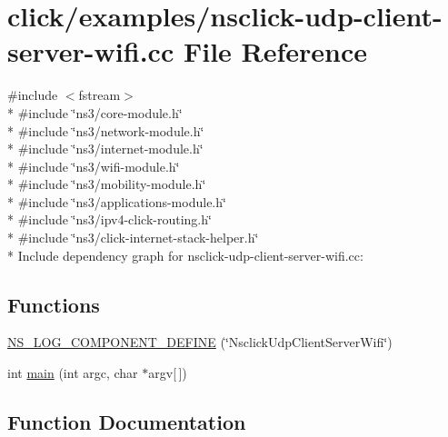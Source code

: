 \hypertarget{nsclick-udp-client-server-wifi_8cc}{}\section{click/examples/nsclick-\/udp-\/client-\/server-\/wifi.cc File Reference}
\label{nsclick-udp-client-server-wifi_8cc}
{\ttfamily \#include $<$fstream$>$}\\*
{\ttfamily \#include \char`\"{}ns3/core-\/module.\+h\char`\"{}}\\*
{\ttfamily \#include \char`\"{}ns3/network-\/module.\+h\char`\"{}}\\*
{\ttfamily \#include \char`\"{}ns3/internet-\/module.\+h\char`\"{}}\\*
{\ttfamily \#include \char`\"{}ns3/wifi-\/module.\+h\char`\"{}}\\*
{\ttfamily \#include \char`\"{}ns3/mobility-\/module.\+h\char`\"{}}\\*
{\ttfamily \#include \char`\"{}ns3/applications-\/module.\+h\char`\"{}}\\*
{\ttfamily \#include \char`\"{}ns3/ipv4-\/click-\/routing.\+h\char`\"{}}\\*
{\ttfamily \#include \char`\"{}ns3/click-\/internet-\/stack-\/helper.\+h\char`\"{}}\\*
Include dependency graph for nsclick-\/udp-\/client-\/server-\/wifi.cc\+:
\subsection*{Functions}
\begin{DoxyCompactItemize}
\item 
\hyperlink{nsclick-udp-client-server-wifi_8cc_a552a8f515fb87296a598c33f5cf6a845}{N\+S\+\_\+\+L\+O\+G\+\_\+\+C\+O\+M\+P\+O\+N\+E\+N\+T\+\_\+\+D\+E\+F\+I\+NE} (\char`\"{}Nsclick\+Udp\+Client\+Server\+Wifi\char`\"{})
\item 
int \hyperlink{nsclick-udp-client-server-wifi_8cc_a0ddf1224851353fc92bfbff6f499fa97}{main} (int argc, char $\ast$argv\mbox{[}$\,$\mbox{]})
\end{DoxyCompactItemize}


\subsection{Function Documentation}
